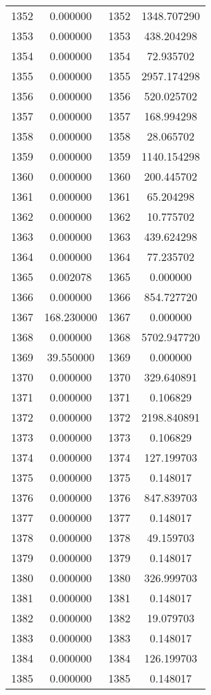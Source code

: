 \documentclass[12pt]{article}
\begin{document}
\begin{longtable}{@{}cccc@{}}
1352 & 0.000000 & 1352 & 1348.707290 \\
1353 & 0.000000 & 1353 & 438.204298 \\
1354 & 0.000000 & 1354 & 72.935702 \\
1355 & 0.000000 & 1355 & 2957.174298 \\
1356 & 0.000000 & 1356 & 520.025702 \\
1357 & 0.000000 & 1357 & 168.994298 \\
1358 & 0.000000 & 1358 & 28.065702 \\
1359 & 0.000000 & 1359 & 1140.154298 \\
1360 & 0.000000 & 1360 & 200.445702 \\
1361 & 0.000000 & 1361 & 65.204298 \\
1362 & 0.000000 & 1362 & 10.775702 \\
1363 & 0.000000 & 1363 & 439.624298 \\
1364 & 0.000000 & 1364 & 77.235702 \\
1365 & 0.002078 & 1365 & 0.000000 \\
1366 & 0.000000 & 1366 & 854.727720 \\
1367 & 168.230000 & 1367 & 0.000000 \\
1368 & 0.000000 & 1368 & 5702.947720 \\
1369 & 39.550000 & 1369 & 0.000000 \\
1370 & 0.000000 & 1370 & 329.640891 \\
1371 & 0.000000 & 1371 & 0.106829 \\
1372 & 0.000000 & 1372 & 2198.840891 \\
1373 & 0.000000 & 1373 & 0.106829 \\
1374 & 0.000000 & 1374 & 127.199703 \\
1375 & 0.000000 & 1375 & 0.148017 \\
1376 & 0.000000 & 1376 & 847.839703 \\
1377 & 0.000000 & 1377 & 0.148017 \\
1378 & 0.000000 & 1378 & 49.159703 \\
1379 & 0.000000 & 1379 & 0.148017 \\
1380 & 0.000000 & 1380 & 326.999703 \\
1381 & 0.000000 & 1381 & 0.148017 \\
1382 & 0.000000 & 1382 & 19.079703 \\
1383 & 0.000000 & 1383 & 0.148017 \\
1384 & 0.000000 & 1384 & 126.199703 \\
1385 & 0.000000 & 1385 & 0.148017 \\

\end{longtable}
\end{document}
